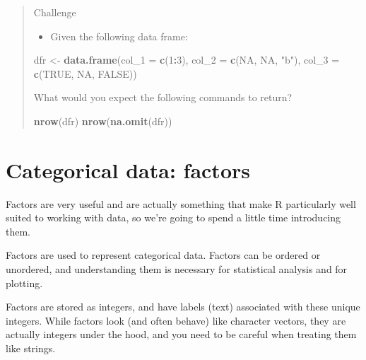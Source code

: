 \documentclass[
]{book}
\newenvironment{Shaded}{\begin{snugshade}}{\end{snugshade}}
\newcommand{\DataTypeTok}[1]{\textcolor[rgb]{0.13,0.29,0.53}{#1}}
\newcommand{\DecValTok}[1]{\textcolor[rgb]{0.00,0.00,0.81}{#1}}
\newcommand{\KeywordTok}[1]{\textcolor[rgb]{0.13,0.29,0.53}{\textbf{#1}}}
\newcommand{\NormalTok}[1]{#1}
\newcommand{\OperatorTok}[1]{\textcolor[rgb]{0.81,0.36,0.00}{\textbf{#1}}}
\newcommand{\OtherTok}[1]{\textcolor[rgb]{0.56,0.35,0.01}{#1}}
\newcommand{\StringTok}[1]{\textcolor[rgb]{0.31,0.60,0.02}{#1}}
\providecommand{\tightlist}{%
  \setlength{\itemsep}{0pt}\setlength{\parskip}{0pt}}
\begin{document}
\begin{quote}
Challenge

\begin{itemize}
\tightlist
\item
  Given the following data frame:
\end{itemize}

\begin{Shaded}
\begin{Highlighting}[]
\NormalTok{dfr <-}\StringTok{ }\KeywordTok{data.frame}\NormalTok{(}\DataTypeTok{col_1 =} \KeywordTok{c}\NormalTok{(}\DecValTok{1}\OperatorTok{:}\DecValTok{3}\NormalTok{), }
                  \DataTypeTok{col_2 =} \KeywordTok{c}\NormalTok{(}\OtherTok{NA}\NormalTok{, }\OtherTok{NA}\NormalTok{, }\StringTok{"b"}\NormalTok{), }
                  \DataTypeTok{col_3 =} \KeywordTok{c}\NormalTok{(}\OtherTok{TRUE}\NormalTok{, }\OtherTok{NA}\NormalTok{, }\OtherTok{FALSE}\NormalTok{))}
\end{Highlighting}
\end{Shaded}

What would you expect the following commands to return?

\begin{Shaded}
\begin{Highlighting}[]
\KeywordTok{nrow}\NormalTok{(dfr)}
\KeywordTok{nrow}\NormalTok{(}\KeywordTok{na.omit}\NormalTok{(dfr))}
\end{Highlighting}
\end{Shaded}
\end{quote}

\hypertarget{categorical-data-factors}{%
\section{Categorical data: factors}\label{categorical-data-factors}}

Factors are very useful and are actually
something that make R particularly well suited to working with data, so we're
going to spend a little time introducing them.

Factors are used to represent categorical data. Factors can be ordered or
unordered, and understanding them is necessary for statistical analysis and for
plotting.

Factors are stored as integers, and have labels (text) associated with these
unique integers. While factors look (and often behave) like character vectors,
they are actually integers under the hood, and you need to be careful when
treating them like strings.
\end{document}
